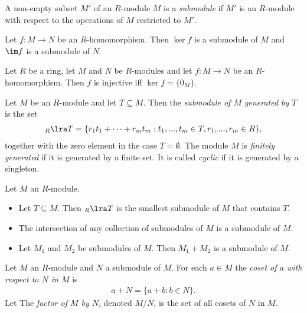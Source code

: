 \documentclass{article}
\begin{document}
\begin{definition}
	A non-empty subset $M'$ of an $R$-module $M$ is a \emph{submodule} if $M'$ is an
	$R$-module with respect to the operations of $M$ restricted to $M'$.
\end{definition}

\begin{lemma}[Notes 3.7.21]
	Let $f:M\to N$ be an $R$-homomorphism. Then $\ker f$ is a submodule of $M$ and $\im f$
	is a submodule of $N$.
\end{lemma}

\begin{lemma}[Notes 3.7.22]
	Let $R$ be a ring, let $M$ and $N$ be $R$-modules and let $f:M\to N$ be an $R$-homomorphism.
	Then $f$ is injective iff $\ker f =\{0_M\}$.
\end{lemma}

\begin{definition}
	Let $M$ be an $R$-module and let $T\subseteq M$. Then the \emph{submodule of $M$ generated by $T$}
	is the set
	\begin{align*}
		_R\lra T = \{r_1t_1+\cdots+r_mt_m:t_1,...,t_m\in T,r_1,...,r_m\in R\},
	\end{align*}
	together with the zero element in the case $T=\emptyset$. The module $M$ is \emph{finitely generated}
	if it is generated by a finite set. It is called \emph{cyclic} if it is generated by a singleton.
\end{definition}

\begin{lemma}[Notes 3.7.28-30]
	Let $M$ an $R$-module.
	\begin{itemize}
		\item Let $T\subseteq M$. Then $_R\lra T$ is the smallest submodule of $M$ that contains $T$.
		\item The intersection of any collection of submodules of $M$ is a submodule of $M$.
		\item Let $M_1$ and $M_2$ be submodules of $M$. Then $M_1+M_2$ is a submodule of $M$.
	\end{itemize}
\end{lemma}

\begin{definition}
	Let $M$ an $R$-module and $N$ a submodule of $M$. For each $a\in M$ the \emph{coset of $a$ with
		respect to $N$ in $M$} is
	\begin{align*}
		a+N=\{a+b:b\in N\}.
	\end{align*}
	Let
	The \emph{factor of $M$ by $N$}, denoted $M/N$, is the set of all cosets of $N$ in $M$.
\end{definition}
\end{document}
